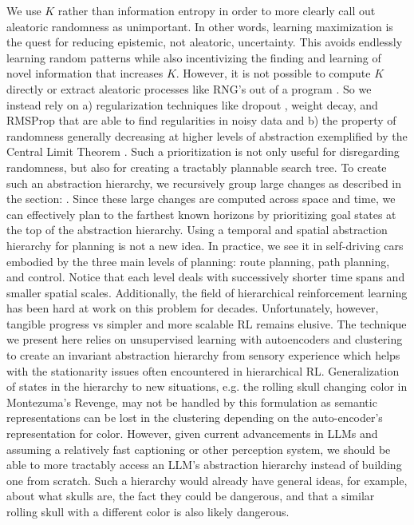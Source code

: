\documentclass{article}
\begin{document}
We use $K$ rather than information entropy in order to more clearly call out aleatoric randomness as unimportant. In other words, learning maximization is the quest for reducing epistemic, not aleatoric, uncertainty. This avoids endlessly learning random patterns while also incentivizing the finding and learning of novel information that increases $K$. However, it is not possible to compute $K$ directly or extract aleatoric processes like RNG's out of a program \cite{wiki-kolm-cpx-uncomput}. So we instead rely on a) regularization techniques like dropout \cite{srivastava2014dropout}, weight decay\cite{krogh1991simple}\cite{loshchilov2017decoupled}, and RMSProp \cite{hinton2012}\cite{kingma2017adam} that are able to find regularities in noisy data and b) the property of randomness generally decreasing at higher levels of abstraction exemplified by the Central Limit Theorem \cite{wiki-cent-lim-theo}. Such a prioritization is not only useful for disregarding randomness, but also for creating a tractably plannable\cite{gat1998three} search tree. To create such an abstraction hierarchy, we recursively group large changes as described in the section: . Since these large changes are computed across space and time, we can effectively plan to the farthest known horizons by prioritizing goal states at the top of the abstraction hierarchy. Using a temporal and spatial abstraction hierarchy for planning is not a new idea. In practice, we see it in self-driving cars embodied by the three main levels of planning: route planning, path planning, and control\cite{gat1998three}. Notice that each level deals with successively shorter time spans and smaller spatial scales. Additionally, the field of hierarchical reinforcement learning\cite{BerliacHierachialRL2019} has been hard at work on this problem for decades. Unfortunately, however, tangible progress vs simpler and more scalable RL\cite{openai2019dota} remains elusive. The technique we present here relies on unsupervised learning with autoencoders and clustering to create an invariant abstraction hierarchy from sensory experience which helps with the stationarity\cite{BerliacHierachialRL2019} issues often encountered in hierarchical RL. Generalization of states in the hierarchy to new situations, e.g. the rolling skull changing color in Montezuma's Revenge, may not be handled by this formulation as semantic representations can be lost in the clustering depending on the auto-encoder's representation for color. However, given current advancements in LLMs and assuming a relatively fast captioning\cite{li2022mplug} or other perception system\cite{wang2022yolov7}, we should be able to more tractably access an LLM's abstraction hierarchy instead of building one from scratch. Such a hierarchy would already have general ideas, for example, about what skulls are, the fact they could be dangerous, and that a similar rolling skull with a different color is also likely dangerous.
\end{document}
